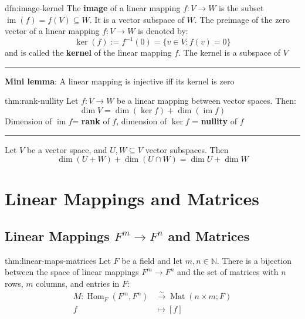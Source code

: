 \documentclass[landscape, 8pt]{extarticle}
\DeclareMathOperator{\Ima}{im}
\DeclareMathOperator{\Mat}{Mat}
\DeclareMathOperator{\Hom}{Hom}
\begin{document}
\begin{multicols}{3}

\vspace{-5pt}
\begin{dfn}{dfn:image-kernel}{}
    The \textbf{image} of a linear mapping $f : V \to W$ is the subset $\Ima(f) = f(V) \subseteq W$. It is a vector subspace of $W$. The preimage of the zero vector of a linear mapping $f : V \to W$ is denoted by:
    \[\ker(f) := f^{-1}(0) = \{v\in V : f(v) = 0\}\]
    and is called the \textbf{kernel} of the linear mapping $f$. The kernel is a subspace of $V$

    \noindent\rule{\textwidth}{0.2pt}
    \textbf{Mini lemma}: A linear mapping is injective iff its kernel is zero
\end{dfn}

\begin{thm}{thm:rank-nullity}{}
    Let $f : V \to W$ be a linear mapping between vector spaces. Then:
    \[\dim V = \dim(\ker f) + \dim (\Ima f)\]
    Dimension of $\Ima f$= \textbf{rank} of $f$, dimension of $\ker f$ = \textbf{nullity} of $f$

    \noindent\rule{\textwidth}{0.2pt}
    Let $V$ be a vector space, and $U,W\subseteq V$ vector subspaces. Then
    \[\dim(U + W) + \dim(U \cap W) = \dim U + \dim W\]
\end{thm}

\section{Linear Mappings and Matrices}
\subsection{Linear Mappings \texorpdfstring{$F^{m}\to F^{n}$}{Fm to Fn} and Matrices}
\begin{thm}{thm:linear-maps-matrices}{}
    Let $F$ be a field and let $m,n\in \mathbb{N}$. There is a bijection between the space of linear mappings $F^{m}\to F^{n}$ and the set of matrices with $n$ rows, $m$ columns, and entries in $F$:
    \begin{align*}
        M : \Hom_{F}(F^{m}, F^{n}) &\xrightarrow{\sim} \Mat(n \times m; F)\\
        f &\mapsto [f]
    \end{align*}


\end{thm}
\end{multicols}
\end{document}
